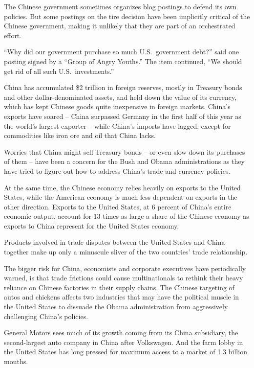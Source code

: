 ﻿\documentclass[12pt]{article}
\begin{document}
The Chinese government sometimes organizes blog postings to defend its own policies. But some
postings on the tire decision have been implicitly critical of the Chinese government, making it
unlikely that they are part of an orchestrated effort.

``Why did our government purchase so much U.S.~government debt?'' said one posting signed by a
``Group of Angry Youths.'' The item continued, ``We should get rid of all such U.S.~investments.''

China has accumulated \$2 trillion in foreign reserves, mostly in Treasury bonds and other
dollar-denominated assets, and held down the value of its currency, which has kept Chinese goods
quite inexpensive in foreign markets. China's exports have soared -- China surpassed Germany in the
first half of this year as the world's largest exporter -- while China's imports have lagged, except
for commodities like iron ore and oil that China lacks.

Worries that China might sell Treasury bonds -- or even slow down its purchases of them -- have been
a concern for the Bush and Obama administrations as they have tried to figure out how to address
China's trade and currency policies.

At the same time, the Chinese economy relies heavily on exports to the United States, while the
American economy is much less dependent on exports in the other direction. Exports to the United
States, at 6 percent of China's entire economic output, account for 13 times as large a share of the
Chinese economy as exports to China represent for the United States economy.

Products involved in trade disputes between the United States and China together make up only a
minuscule sliver of the two countries' trade relationship.

The bigger risk for China, economists and corporate executives have periodically warned, is that
trade frictions could cause multinationals to rethink their heavy reliance on Chinese factories in
their supply chains. The Chinese targeting of autos and chickens affects two industries that may
have the political muscle in the United States to dissuade the Obama administration from
aggressively challenging China's policies.

General Motors sees much of its growth coming from its China subsidiary, the second-largest auto
company in China after Volkswagen. And the farm lobby in the United States has long pressed for
maximum access to a market of 1.3 billion mouths.
\end{document}
